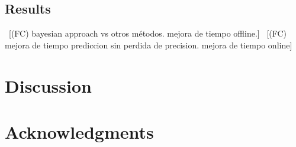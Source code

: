\documentclass[nofootinbib]{revtex4-2}
\newcommand{\fc}[1]{{\color{violet}~\textsf{[(FC) #1]}}}
\begin{document}
\subsection{Results}
\fc{bayesian approach vs otros métodos. mejora de tiempo offline.}
\fc{mejora de tiempo prediccion sin perdida de precision. mejora de tiempo online}

\section{Discussion} \label{sec:com}

\section{Acknowledgments} \label{sec:ack}



\end{document}
